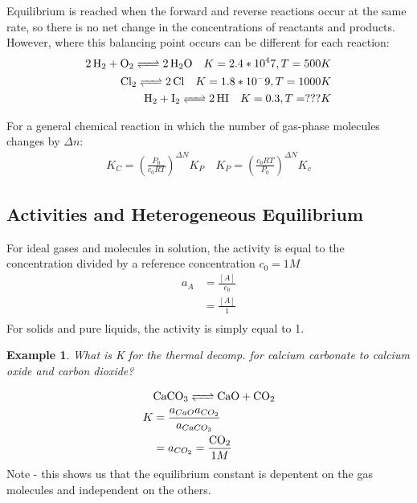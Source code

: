 \documentclass{article}  %
\newtheorem{exmp}{Example}
\begin{document}
Equilibrium is reached when the forward and reverse reactions occur at the same rate, so there is no net change in the concentrations of reactants and products. However, where this balancing point occurs can be different for each reaction:
\begin{equation*}
    \begin{aligned}
        \ce{2H2 + O2 <=> 2H2O} \quad K = 2.4 * 10^47, T = 500 K \\
        \ce{Cl2 <=> 2Cl} \quad K = 1.8 * 10 ^-9, T = 1000 K \\
        \ce{H2 + I2 <=> 2HI} \quad K = 0.3, T = ??? K
    \end{aligned}
\end{equation*}

For a general chemical reaction in which the number of gas-phase molecules changes by $\Delta n$: 
\begin{equation*}
    \begin{aligned}
        K_C = (\frac{P_0}{c_0RT})^{\Delta N} K_P \quad K_P = (\frac{c_0RT}{P_0})^{\Delta N} K_c
    \end{aligned}
\end{equation*}

\subsection*{Activities and Heterogeneous Equilibrium}
For ideal gases and molecules in solution, the activity is equal to the concentration divided by a reference concentration $c_0 = 1M$
\begin{equation*}
    \begin{aligned}
        a_A &= \frac{[A]}{c_0} \\
            &=\frac{[A]}{1} \\
    \end{aligned}
\end{equation*}
For solids and pure liquids, the activity is simply equal to 1.
\begin{exmp}
    What is K for the thermal decomp. for calcium carbonate to calcium oxide and carbon dioxide?
\end{exmp}
\begin{equation*}
    \begin{aligned}
        &\ce{CaCO3 <=> CaO + CO2} \\
        K &= \frac{a_{CaO}a_{CO_2}}{a_{CaCO_3}} \\
          &= a_{CO_2} = \frac{\ce{CO2}}{1M}
    \end{aligned}
\end{equation*}
Note - this shows us that the equilibrium constant is depentent on the gas molecules and independent on the others.
\end{document}
